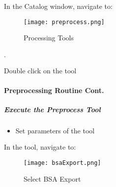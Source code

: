  \noindent In the Catalog window, navigate to:

 \noindent \textcolor{HyperlinkBlue1}{\scriptsize{}}
  \begin{wrapfigure}{r}{0.5\textwidth}
  \centering
      \texttt{[image: preprocess.png]}
  \vspace{-.1in}

  \caption{Processing Tools}
  \end{wrapfigure}
  .
  \vspace{2in}

  \vspace{.5in}

 
 \noindent Double click on the tool


 \clearpage


 \paragraph*{Preprocessing Routine Cont.}

  \subparagraph{Execute the Preprocess Tool}
  \vspace{.15in}

  \begin{itemize}
  \item Set parameters of the tool
  \end{itemize}
 
 \vspace{.15in}

 \noindent In the tool, navigate to:
  \noindent \textcolor{HyperlinkBlue1}{\scriptsize{}}
 
  \begin{figure}[h!]
  \centering
      \texttt{[image: bsaExport.png]}
  \vspace{-.1in}

  \caption{Select BSA Export}
 \end{figure}
 

